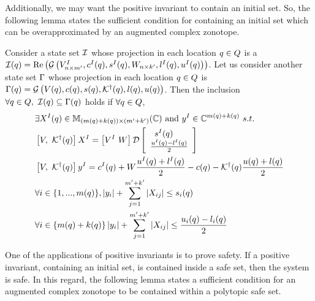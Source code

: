 Additionally, we may want the positive invariant to contain an initial
set.  So, the following lemma states the sufficient condition for
containing an initial set which can be overapproximated by an
augmented complex zonotope.
\begin{lemma}
  Consider a state set $\mathcal{I}$ whose projection in each location
  $q\in Q$ is a $\mathcal{I}(q)=\operatorname{\operatorname{Re}}\left(\mathcal{G}\left(V^I_{n\times
      m^\prime },c^I(q),s^I(q),W_{n\times
      k^\prime},l^I(q),u^I(q)\right)\right)$.  Let us consider another
  state set $\Gamma$ whose projection in each location $q\in
  Q$ is $\Gamma(q) =
  \mathcal{G}\left(V(q),c(q),s(q),\mathcal{K}^\dagger(q),l(q),u(q)\right)$.
  Then the inclusion
  $\forall q\in Q,~\mathcal{I}(q)\subseteq \Gamma(q)$
  holds if $\forall q\in Q$, 
\begin{align}
\begin{split}
& \exists X^I(q)\in\mathbb{M}_{(m(q)+k(q))\times (m^\prime+k^\prime)}(\mathbb{\mathbb{C}})~\text{and}~y^I\in\mathbb{C}^{m(q)+k(q)}~s.t.\\
& \left[V,~\mathcal{K}^\dagger(q)\right]X^I = \left[V^I~W\right]\mathcal{D}\left[\begin{array}{l}{\hspace{0.5em}s^I(q)}\\{\frac{u^I(q)-l^I(q)}{2}} \end{array}\right]\\
& \left[V,~\mathcal{K}^\dagger(q)\right]y^I =
c^I(q)+W\frac{u^I(q)+l^I(q)}{2}-c(q)-\mathcal{K}^\dagger(q)\frac{u(q)+l(q)}{2}\\
& \forall i\in\{1,...,m(q)\},
\left|y_i\right|+\sum_{j=1}^{m^\prime+k^\prime}\left|X_{ij}\right|\leq s_i(q)\\
& \forall
i\in\left\{m(q)+k(q)\right\}\left|y_i\right|+\sum_{j=1}^{m^\prime+k^\prime}\left|X_{ij}\right|\leq \frac{u_i(q)-l_i(q)}{2}
\end{split}
\end{align}
\end{lemma}

One of the applications of positive invariants is to prove safety.  If
a positive invariant, containing an initial set, is contained inside a
safe set, then the system is safe.  In this regard, the following
lemma states a sufficient condition for an augmented complex zonotope
to be contained within a polytopic safe set.

